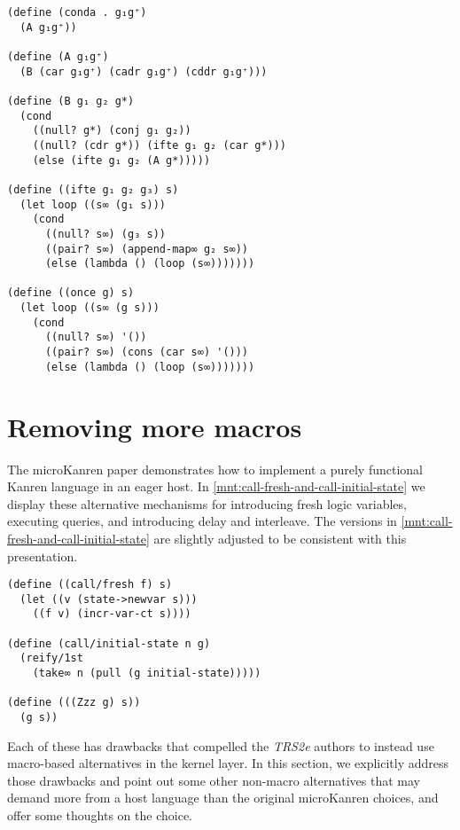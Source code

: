 \documentclass[sigplan,balance=true,pbalance=true,natbib=false]{acmart}
\begin{document}
\begin{listing}[h]
  \begin{verbatim}
(define (conda . g₁g⁺)
  (A g₁g⁺))

(define (A g₁g⁺)
  (B (car g₁g⁺) (cadr g₁g⁺) (cddr g₁g⁺)))

(define (B g₁ g₂ g*)
  (cond
    ((null? g*) (conj g₁ g₂))
    ((null? (cdr g*)) (ifte g₁ g₂ (car g*)))
    (else (ifte g₁ g₂ (A g*)))))

(define ((ifte g₁ g₂ g₃) s)
  (let loop ((s∞ (g₁ s)))
    (cond
      ((null? s∞) (g₃ s))
      ((pair? s∞) (append-map∞ g₂ s∞))
      (else (lambda () (loop (s∞)))))))

(define ((once g) s)
  (let loop ((s∞ (g s)))
    (cond
      ((null? s∞) '())
      ((pair? s∞) (cons (car s∞) '()))
      (else (lambda () (loop (s∞)))))))
  \end{verbatim}
  \caption{A functional , , and }\label{mnt:conda-implementation}
\end{listing}

\section{Removing more macros}\label{sec:functional}

The \citeyear{hemann2013muKanren} microKanren paper demonstrates how
to implement a purely functional Kanren language in an eager host. In
\cref{mnt:call-fresh-and-call-initial-state} we display these
alternative mechanisms for introducing fresh logic variables,
executing queries, and introducing delay and interleave. The versions
in \cref{mnt:call-fresh-and-call-initial-state} are slightly adjusted
to be consistent with this presentation.

\begin{listing}
  \begin{verbatim}
(define ((call/fresh f) s)
  (let ((v (state->newvar s)))
    ((f v) (incr-var-ct s))))

(define (call/initial-state n g)
  (reify/1st
    (take∞ n (pull (g initial-state)))))

(define (((Zzz g) s))
  (g s))
  \end{verbatim}
  \caption{Functional microKanren equivalents of \emph{TRS2e} kernel macros}\label{mnt:call-fresh-and-call-initial-state}
\end{listing}

Each of these has drawbacks that compelled the \emph{TRS2e} authors to
instead use macro-based alternatives in the kernel layer. In this
section, we explicitly address those drawbacks and point out some
other non-macro alternatives that may demand more from a host language
than the original microKanren choices, and offer some thoughts on the
choice.
\end{document}
